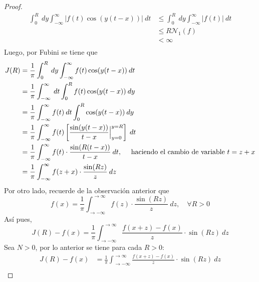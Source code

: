\documentclass[12pt]{report}
\newcounter{it}
\theoremstyle{largebreak}
\renewcommand{\leq}{\ensuremath{\leqslant}}
\newcommand\abs[1]{\ensuremath{\left|#1\right|}}
\newcommand{\N}[2]{\ensuremath{\mathcal{N}_{#1}\left(#2\right)}}
\begin{document}
\begin{proof}
        \begin{equation*}
            \begin{split}
                \int_0^R\:dy\int_{-\infty}^\infty \abs{f(t)\cos(y(t-x))}\:dt&\leq\int_0^R\:dy\int_{-\infty}^\infty \abs{f(t)}\:dt\\
                &\leq R\N{1}{f}\\
                &<\infty\\
            \end{split}
        \end{equation*}
        Luego, por Fubini se tiene que
        \begin{equation*}
            \begin{split}
                J(R)&=\frac{1}{\pi}\int_0^R\:dy\int_{-\infty}^\infty f(t)\cos(y(t-x))\:dt\\
                &=\frac{1}{\pi}\int_{-\infty}^\infty\:dt\int_0^R f(t)\cos(y(t-x))\:dy\\
                &=\frac{1}{\pi}\int_{-\infty}^\infty f(t)\:dt\int_0^R \cos(y(t-x))\:dy\\
                &=\frac{1}{\pi}\int_{-\infty}^\infty f(t)\left[\frac{\sin(y(t-x))}{t-x}\Big|_{ y=0}^{ y=R} \right]\:dt\\
                &=\frac{1}{\pi}\int_{-\infty}^\infty f(t)\cdot\frac{\sin(R(t-x))}{t-x}\:dt,\quad\textup{ haciendo el cambio de variable }t=z+x \\
                &=\frac{1}{\pi}\int_{-\infty}^\infty f(z+x)\cdot\frac{\sin(Rz)}{z}\:dz\\
            \end{split}
        \end{equation*}
        Por otro lado, recuerde de la observación anterior que
        \begin{equation*}
            f(x)=\frac{1}{\pi}\int_{\rightarrow-\infty}^{\rightarrow\infty} f(z)\cdot\frac{\sin(Rz)}{z}\:dz,\quad\forall R>0
        \end{equation*}
        Así pues,
        \begin{equation*}
            J(R)-f(x)=\frac{1}{\pi}\int_{\rightarrow-\infty}^{\rightarrow\infty}\frac{f(x+z)-f(x)}{z}\cdot\sin(Rz)\:dz
        \end{equation*}
        Sea $N>0$, por lo anterior se tiene para cada $R>0$:
        \begin{equation*}
            \begin{split}
                J(R)-f(x)&=\frac{1}{\pi}\int_{\rightarrow-\infty}^{\rightarrow\infty}\frac{f(x+z)-f(x)}{z}\cdot\sin(Rz)\:dz\\

\end{split}
\end{equation*}
\end{proof}
\end{document}
